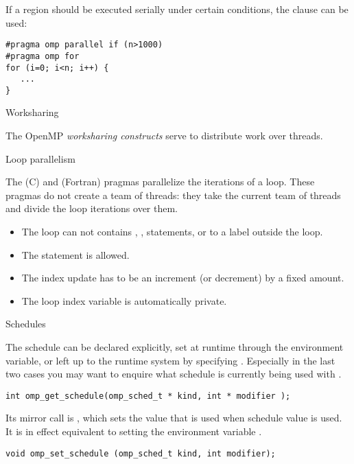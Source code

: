 If a region should be executed serially under certain conditions,
the  clause can be used:
\begin{verbatim}
#pragma omp parallel if (n>1000)
#pragma omp for
for (i=0; i<n; i++) {
   ...
}
\end{verbatim}

 {Worksharing}

The OpenMP \emph{worksharing constructs} serve to distribute work
over threads.

 {Loop parallelism}

The  (C) and  (Fortran) pragmas
parallelize the iterations of a loop. 
These pragmas do not create a team of threads: they
take the current team of threads and divide the loop iterations over them.
\begin{itemize}
\item The loop can not contains , ,  statements, or
   to a label outside the loop.
\item The  statement is allowed.
\item The index update has to be an increment (or decrement) by a fixed amount.
\item The loop index variable is automatically private.
\end{itemize}

 {Schedules}

The schedule can be declared explicitly, set at runtime
through the  environment variable, or left up to the runtime system
by specifying . Especially in the last two cases  you may want to enquire
what schedule is currently being used with
.
\begin{verbatim}
int omp_get_schedule(omp_sched_t * kind, int * modifier );
\end{verbatim}

Its mirror call is , which sets the
value that is used when schedule value  is used. It is in
effect equivalent to setting the environment variable
.
\begin{verbatim}
void omp_set_schedule (omp_sched_t kind, int modifier);
\end{verbatim}

